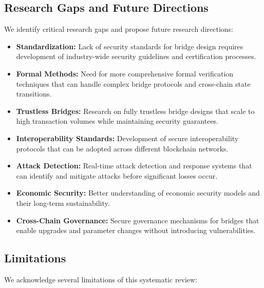 \documentclass[runningheads]{llncs}
\begin{document}
\subsection{Research Gaps and Future Directions}
We identify critical research gaps and propose future research directions:

\begin{itemize}
    \item \textbf{Standardization:} Lack of security standards for bridge design requires development of industry-wide security guidelines and certification processes.
    
    \item \textbf{Formal Methods:} Need for more comprehensive formal verification techniques that can handle complex bridge protocols and cross-chain state transitions.
    
    \item \textbf{Trustless Bridges:} Research on fully trustless bridge designs that scale to high transaction volumes while maintaining security guarantees.
    
    \item \textbf{Interoperability Standards:} Development of secure interoperability protocols that can be adopted across different blockchain networks.
    
    \item \textbf{Attack Detection:} Real-time attack detection and response systems that can identify and mitigate attacks before significant losses occur.
    
    \item \textbf{Economic Security:} Better understanding of economic security models and their long-term sustainability.
    
    \item \textbf{Cross-Chain Governance:} Secure governance mechanisms for bridges that enable upgrades and parameter changes without introducing vulnerabilities.
\end{itemize}

\subsection{Limitations}
We acknowledge several limitations of this systematic review:
\end{document}
